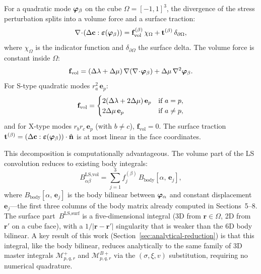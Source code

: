 For a quadratic mode $\bm{\varphi}_\beta$ on the cube $\Omega = [-1,1]^3$,
the divergence of the stress perturbation splits into a volume force
and a surface traction:
\begin{equation}
  \nabla\!\cdot\!(\Delta\mathbf{c}:\bm{\varepsilon}(\bm{\varphi}_\beta))
  = \mathbf{f}_{\text{vol}}^{(\beta)}\,\chi_\Omega
  + \mathbf{t}^{(\beta)}\,\delta_{\partial\Omega},
  \label{eq:vol-surf-split}
\end{equation}
where $\chi_\Omega$ is the indicator function and
$\delta_{\partial\Omega}$ the surface delta.  The volume force is
constant inside $\Omega$:
\begin{equation}
  \mathbf{f}_{\text{vol}} = (\Delta\lambda + \Delta\mu)\,\nabla(\nabla\!\cdot\!\bm{\varphi}_\beta)
  + \Delta\mu\,\nabla^2\bm{\varphi}_\beta.
\end{equation}
For S-type quadratic modes $r_a^2\,\mathbf{e}_p$:
\begin{equation}
  \mathbf{f}_{\text{vol}} = \begin{cases}
    2(\Delta\lambda + 2\Delta\mu)\,\mathbf{e}_p & \text{if } a = p, \\
    2\Delta\mu\,\mathbf{e}_p                & \text{if } a \neq p,
  \end{cases}
\end{equation}
and for X-type modes $r_b r_c\,\mathbf{e}_p$ (with $b \neq c$),
$\mathbf{f}_{\text{vol}} = 0$.  The surface traction
$\mathbf{t}^{(\beta)} = (\Delta\mathbf{c}:\bm{\varepsilon}(\bm{\varphi}_\beta))\cdot\hat{\mathbf{n}}$
is at most linear in the face coordinates.

This decomposition is computationally advantageous.  The volume part of
the LS convolution reduces to existing body integrals:
\begin{equation}
  B^{\text{LS,vol}}_{\alpha\beta}
  = \sum_{j=1}^{3} f^{(\beta)}_j \, B_{\text{body}}[\alpha,\,\mathbf{e}_j],
  \label{eq:bstiff-vol}
\end{equation}
where $B_{\text{body}}[\alpha,\,\mathbf{e}_j]$ is the body bilinear
between $\bm{\varphi}_\alpha$ and constant displacement $\mathbf{e}_j$---the
first three columns of the body matrix already computed in Sections~5--8.
The surface part~$B^{\text{LS,surf}}$ is a five-dimensional integral
(3D from $\mathbf{r} \in \Omega$, 2D from $\mathbf{r}'$ on a cube
face), with a $1/|\mathbf{r}-\mathbf{r}'|$ singularity that is
weaker than the 6D body bilinear.  A key result of this work
(Section~\ref{sec:analytical-reduction}) is that this integral,
like the body bilinear, reduces analytically to the same family of 3D
master integrals $\mathcal{M}^+_{p,q,r}$ and $\mathcal{M}^{B+}_{p,q,r}$
via the $(\sigma,\xi,v)$ substitution, requiring no numerical quadrature.

